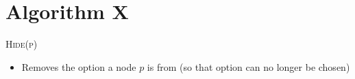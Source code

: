 \documentclass[aspectratio=169]{beamer}
\begin{document}
{
\frame{}
}

\section{Algorithm X}
\frame{\sectionpage}

\begin{frame}{\textsc{Hide(p)}}
\begin{itemize}
    \item Removes the option a node $p$ is from (so that option can no longer be chosen)
\end{itemize}
\end{frame}
\end{document}
